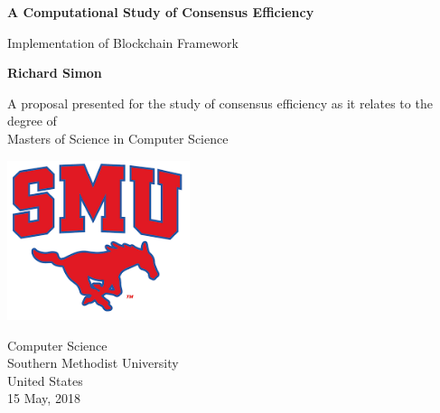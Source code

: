 \documentclass[11pt]{article}
\begin{document}
    \fancyhead{}
    \fancyfoot{}
    \cfoot{\thepage}
    \begin{titlepage}
        \begin{center}
            \vspace*{1cm}

            \textbf{A Computational Study of Consensus Efficiency}

            \vspace{0.5cm}
            Implementation of Blockchain Framework
            \vspace{1.5cm}

            \textbf{Richard Simon}

            \vfill

            A proposal presented for the study of consensus efficiency as it relates to the degree of\\
            Masters of Science in Computer Science

            \vspace{0.8cm}

            \includegraphics[width=0.4\textwidth]{university.png}

            Computer Science\\
            Southern Methodist University\\
            United States\\
            15 May, 2018

        \end{center}
    \end{titlepage}
    \doublespacing
    \tableofcontents
    \newpage
\end{document}
